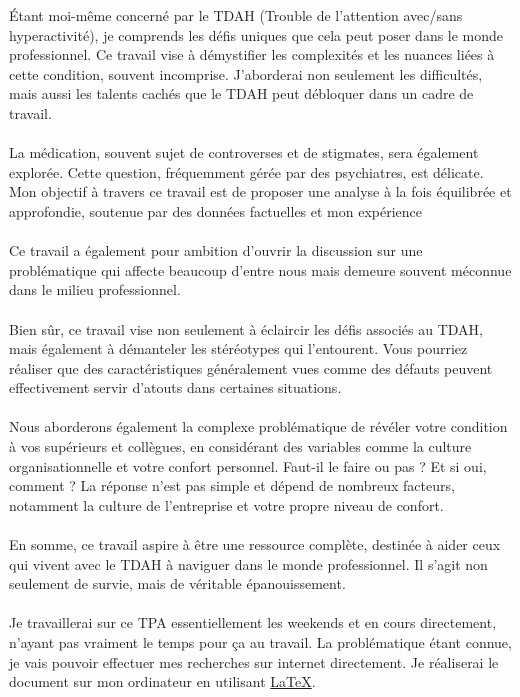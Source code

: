 Étant moi-même concerné par le TDAH (Trouble de l'attention avec/sans hyperactivité), je comprends les défis uniques que cela peut poser dans le monde professionnel. Ce travail vise à démystifier les complexités et les nuances liées à cette condition, souvent incomprise. J'aborderai non seulement les difficultés, mais aussi les talents cachés que le TDAH peut débloquer dans un cadre de travail.
\\
\\
La médication, souvent sujet de controverses et de stigmates, sera également explorée. Cette question, fréquemment gérée par des psychiatres, est délicate. Mon objectif à travers ce travail est de proposer une analyse à la fois équilibrée et approfondie, soutenue par des données factuelles et mon expérience 
\\
\\
Ce travail a également pour ambition d'ouvrir la discussion sur une problématique qui affecte beaucoup d'entre nous mais demeure souvent méconnue dans le milieu professionnel.
\\
\\
Bien sûr, ce travail vise non seulement à éclaircir les défis associés au TDAH, mais également à démanteler les stéréotypes qui l'entourent. Vous pourriez réaliser que des caractéristiques généralement vues comme des défauts peuvent effectivement servir d'atouts dans certaines situations.
\\
\\
Nous aborderons également la complexe problématique de révéler votre condition à vos supérieurs et collègues, en considérant des variables comme la culture organisationnelle et votre confort personnel. Faut-il le faire ou pas ? Et si oui, comment ? La réponse n'est pas simple et dépend de nombreux facteurs, notamment la culture de l'entreprise et votre propre niveau de confort.
\\
\\
En somme, ce travail aspire à être une ressource complète, destinée à aider ceux qui vivent avec le TDAH à naviguer dans le monde professionnel. Il s'agit non seulement de survie, mais de véritable épanouissement.
\\
\\
Je travaillerai sur ce TPA essentiellement les weekends et en cours directement, n'ayant pas vraiment le temps pour ça au travail. La problématique étant connue, je vais pouvoir effectuer mes recherches sur internet directement. Je réaliserai le document sur mon ordinateur en utilisant \href{https://www.latex-project.org/}{LaTeX}.